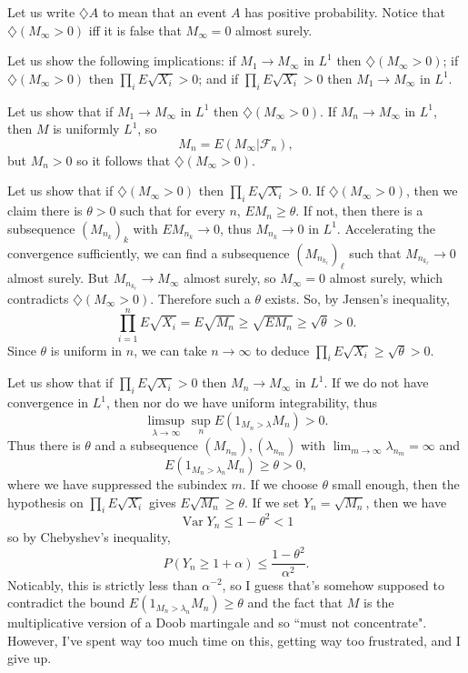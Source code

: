\documentclass[10pt]{article}
\DeclareMathOperator{\Var}{Var}
\theoremstyle{definition}
\begin{document}
Let us write $\diamondsuit A$ to mean that an event $A$ has positive probability.
Notice that $\diamondsuit(M_\infty > 0)$ iff it is false that $M_\infty = 0$ almost surely.

Let us show the following implications: if $M_1 \to M_\infty$ in $L^1$ then $\diamondsuit(M_\infty > 0)$; if $\diamondsuit(M_\infty > 0)$ then $\prod_i E\sqrt{X_i} > 0$; and if $\prod_i E\sqrt{X_i} > 0$ then $M_1 \to M_\infty$ in $L^1$.

Let us show that if $M_1 \to M_\infty$ in $L^1$ then $\diamondsuit(M_\infty > 0)$.
If $M_n \to M_\infty$ in $L^1$, then $M$ is uniformly $L^1$, so
$$M_n = E(M_\infty|\mathcal F_n),$$
but $M_n > 0$ so it follows that $\diamondsuit(M_\infty > 0)$.

Let us show that if $\diamondsuit(M_\infty > 0)$ then $\prod_i E\sqrt{X_i} > 0$.
If $\diamondsuit(M_\infty > 0)$, then we claim there is $\theta > 0$ such that for every $n$, $EM_n \geq \theta$.
If not, then there is a subsequence $(M_{n_k})_k$ with $EM_{n_k} \to 0$, thus $M_{n_k} \to 0$ in $L^1$.
Accelerating the convergence sufficiently, we can find a subsequence $(M_{n_{k_\ell}})_\ell$ such that $M_{n_{k_\ell}} \to 0$ almost surely.
But $M_{n_{k_\ell}} \to M_\infty$ almost surely, so $M_\infty = 0$ almost surely, which contradicts $\diamondsuit(M_\infty > 0)$.
Therefore such a $\theta$ exists. So, by Jensen's inequality,
$$\prod_{i = 1}^n E\sqrt{X_i} = E\sqrt{M_n} \geq \sqrt{EM_n} \geq \sqrt \theta > 0.$$
Since $\theta$ is uniform in $n$, we can take $n \to \infty$ to deduce $\prod_i E\sqrt{X_i} \geq \sqrt \theta > 0$.

Let us show that if $\prod_i E\sqrt{X_i} > 0$ then $M_n \to M_\infty$ in $L^1$.
If we do not have convergence in $L^1$, then nor do we have uniform integrability, thus
$$\limsup_{\lambda \to \infty} \sup_n E(1_{M_n > \lambda} M_n) > 0.$$
Thus there is $\theta$ and a subsequence $(M_{n_m}),(\lambda_{n_m})$ with $\lim_{m \to \infty} \lambda_{n_m} = \infty$ and
$$E(1_{M_n > \lambda_n} M_n) \geq \theta > 0,$$
where we have suppressed the subindex $m$.
If we choose $\theta$ small enough, then the hypothesis on $\prod_i E\sqrt{X_i}$ gives $E\sqrt{M_n} \geq \theta$.
If we set $Y_n = \sqrt{M_n}$, then we have
$$\Var Y_n \leq 1 - \theta^2 < 1$$
so by Chebyshev's inequality,
$$P(Y_n \geq 1 + \alpha) \leq \frac{1 - \theta^2}{\alpha^2}.$$
Noticably, this is strictly less than $\alpha^{-2}$, so I guess that's somehow supposed to contradict the bound $E(1_{M_n > \lambda_n} M_n) \geq \theta$ and the fact that $M$ is the multiplicative version of a Doob martingale and so ``must not concentrate".
However, I've spent way too much time on this, getting way too frustrated, and I give up.
\end{document}
